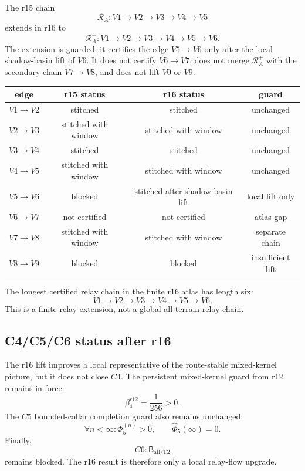 The r15 chain
\[
\mathcal R_A:
V1\to V2\to V3\to V4\to V5
\]
extends in r16 to
\[
\mathcal R_A^{+}:
V1\to V2\to V3\to V4\to V5\to V6.
\]
The extension is guarded: it certifies the edge \(V5\to V6\) only after the
local shadow-basin lift of \(V6\).  It does not certify \(V6\to V7\), does not
merge \(\mathcal R_A^{+}\) with the secondary chain \(V7\to V8\), and does not
lift \(V0\) or \(V9\).

\begin{center}
\begin{tabular}{c|c|c|c}
\toprule
edge & r15 status & r16 status & guard\\
\midrule
$V1\to V2$  & stitched  & stitched  & unchanged\\
$V2\to V3$  & stitched with window  & stitched with window  & unchanged\\
$V3\to V4$  & stitched  & stitched  & unchanged\\
$V4\to V5$  & stitched with window  & stitched with window  & unchanged\\
$V5\to V6$  & blocked  & stitched after shadow-basin lift  & local lift only\\
$V6\to V7$  & not certified  & not certified  & atlas gap\\
$V7\to V8$  & stitched with window  & stitched with window  & separate chain\\
$V8\to V9$  & blocked  & blocked  & insufficient lift\\
\bottomrule
\end{tabular}
\end{center}

\begin{corollary}
\label{cor:v470-r16-finite-chain-status}
The longest certified relay chain in the finite r16 atlas has length six:
\[
V1\to V2\to V3\to V4\to V5\to V6.
\]
This is a finite relay extension, not a global all-terrain relay chain.
\end{corollary}

\subsection{C4/C5/C6 status after r16}
\label{subsec:v470-r16-status-after-lift}

The r16 lift improves a local representative of the route-stable mixed-kernel
picture, but it does not close \(C4\).  The persistent mixed-kernel guard from
r12 remains in force:
\[
\beta_4^{r12}=\frac{1}{256}>0.
\]
The \(C5\) bounded-collar completion guard also remains unchanged:
\[
\forall n<\infty:
\Phi_5^{(n)}>0,
\qquad
\widehat\Phi_5(\infty)=0.
\]
Finally,
\[
C6:\mathsf B_{\mathrm{all/T2}}
\]
remains blocked.  The r16 result is therefore only a local relay-flow upgrade.


